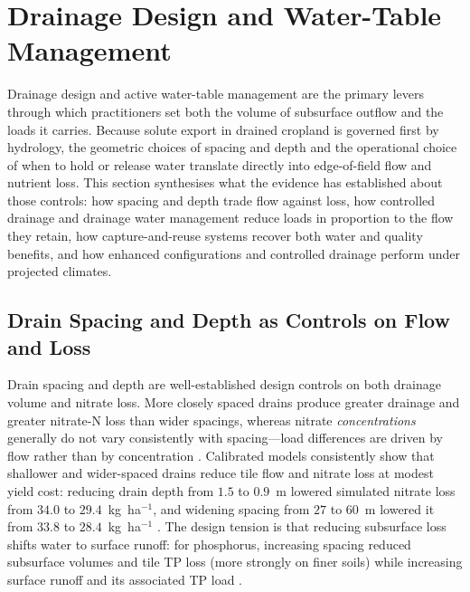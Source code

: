 \documentclass[11pt]{article}
\begin{document}
\section*{Drainage Design and Water-Table Management}

Drainage design and active water-table management are the primary levers
through which practitioners set both the volume of subsurface outflow and the
loads it carries. Because solute export in drained cropland is governed first
by hydrology, the geometric choices of spacing and depth and the operational
choice of when to hold or release water translate directly into edge-of-field
flow and nutrient loss. This section synthesises what the evidence has
established about those controls: how spacing and depth trade flow against
loss, how controlled drainage and drainage water management reduce loads in
proportion to the flow they retain, how capture-and-reuse systems recover both
water and quality benefits, and how enhanced configurations and controlled
drainage perform under projected climates.

\subsection{Drain Spacing and Depth as Controls on Flow and Loss}

Drain spacing and depth are well-established design controls on both drainage
volume and nitrate loss. More closely spaced drains produce greater drainage
and greater nitrate-N loss than wider spacings, whereas nitrate
\emph{concentrations} generally do not vary consistently with spacing---load
differences are driven by flow rather than by concentration
\parencite{Kladivko2021,Kladivko2004}. Calibrated models consistently show that
shallower and wider-spaced drains reduce tile flow and nitrate loss at modest
yield cost: reducing drain depth from $1.5$ to $0.9$~m lowered simulated
nitrate loss from $34.0$ to $29.4$~kg~ha$^{-1}$, and widening spacing from $27$
to $60$~m lowered it from $33.8$ to $28.4$~kg~ha$^{-1}$
\parencite{Moriasi2013,Nangia2010c,Davis2000,Hwang2024}. The design tension is
that reducing subsurface loss shifts water to surface runoff: for phosphorus,
increasing spacing reduced subsurface volumes and tile TP loss (more strongly
on finer soils) while increasing surface runoff and its associated TP load
\parencite{Morrison2013}.
\end{document}
